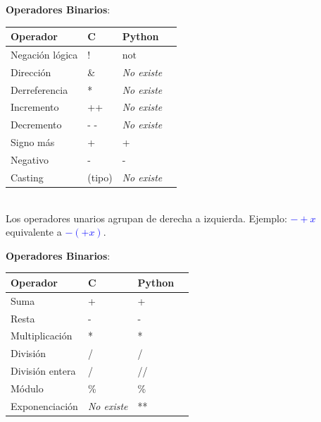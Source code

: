 \documentclass{article}
\begin{document}
\begin{itemize}

\begin{minipage}[h]{0.45\textwidth}
\item \textbf{Operadores Binarios}:

\begin{tabular}{|l|l|l|l|}\hline 
	\textbf{Operador} &\textbf{C} & \textbf{Python}   \\ \hline \hline
	Negación lógica & !  &  $\mbox{not}$ \\  \hline
	Dirección       & \&  &  \emph{No existe} \\  \hline
	Derreferencia   & * &  \emph{No existe} \\  \hline
	Incremento      & ++ &  \emph{No existe} \\  \hline
	Decremento      & - - & \emph{No existe} \\  \hline
	Signo más       & + &  + \\  \hline
	Negativo        & - &  - \\  \hline
	Casting         & (tipo) &  \emph{No existe} \\  \hline
\end{tabular}\\[1em]
Los operadores unarios agrupan de derecha a izquierda. Ejemplo: \textcolor{blue}{$-+ x$} equivalente a \textcolor{blue}{$-(+ x)$}.
\end{minipage}
\hspace{0.5cm}
\begin{minipage}[h]{0.45\textwidth}
\item \textbf{Operadores Binarios}:

\begin{tabular}{|l|l|l|l|}\hline
	\textbf{Operador} &\textbf{C} & \textbf{Python}   \\ \hline \hline
	Suma         & +  & +  \\  \hline
	Resta       & - &  - \\  \hline
	Multiplicación & * & *  \\  \hline
	División      & / &  / \\  \hline
	División entera & /  & //  \\  \hline
	Módulo      & \% & \% \\  \hline
	Exponenciación   & \emph{No existe}  &  ** \\  \hline
\end{tabular}\\[1em]


\end{minipage}
\end{itemize}
\end{document}
